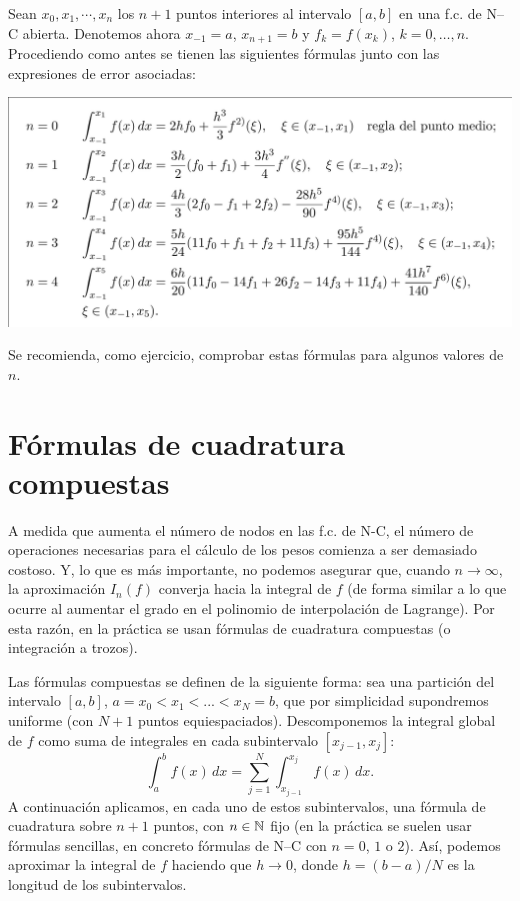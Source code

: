 \begin{example}
  Sean $x_0,x_1,\cdots,x_n$ los $n+1$ puntos interiores al intervalo
  $[a,b]$ en una f.c. de N--C abierta. Denotemos ahora $x_{-1}=a$,
  $x_{n+1}=b$ y $f_k=f(x_k)$, $k=0,\dots,n$. Procediendo como antes
  se tienen las siguientes fórmulas junto con las expresiones de error
  asociadas:
  \begin{center}
    \includegraphics[width=0.95\linewidth]{tema3/formulas-nc-abiertas}
  \end{center}
  Se recomienda, como ejercicio, comprobar estas fórmulas para algunos
  valores de $n$.
\end{example}

\section{Fórmulas de cuadratura compuestas}
\label{sec:fc-compuestas}

A medida que aumenta el número de nodos en las f.c. de N-C, el número
de operaciones necesarias para el cálculo de los pesos comienza a ser
demasiado costoso. Y, lo que es más importante, no podemos asegurar
que, cuando $n\to\infty$, la aproximación $I_n(f)$ converja hacia la
integral de $f$ (de forma similar a lo que ocurre al
aumentar el grado en el polinomio de interpolación de Lagrange). Por
esta razón, en la práctica se usan fórmulas de cuadratura
compuestas (o integración a trozos).

Las fórmulas compuestas se definen de la siguiente forma: sea una
partición del intervalo $[a,b]$, $a=x_0<x_1<...<x_N=b$, que por
simplicidad supondremos uniforme (con $N+1$ puntos
equiespaciados).  Descomponemos
la integral global de $f$ como suma de integrales en cada subintervalo
$[x_{j-1},x_j]$:
\begin{equation*}
  \int_a^b f(x)\,dx = \sum_{j=1}^N \int_{x_{j-1}}^{x_j}f(x)\,dx.
\end{equation*}
A continuación aplicamos, en cada uno de estos subintervalos, una
fórmula de cuadratura sobre $n+1$ puntos, con $n\in\operatorname{{\mathbb N}}$ fijo (en la
práctica se suelen usar fórmulas sencillas, en concreto fórmulas de
N--C con $n=0$, $1$ o $2$). Así, podemos aproximar la integral de $f$
haciendo que $h\to 0$, donde $h=(b-a)/N$ es la longitud de
los subintervalos.

